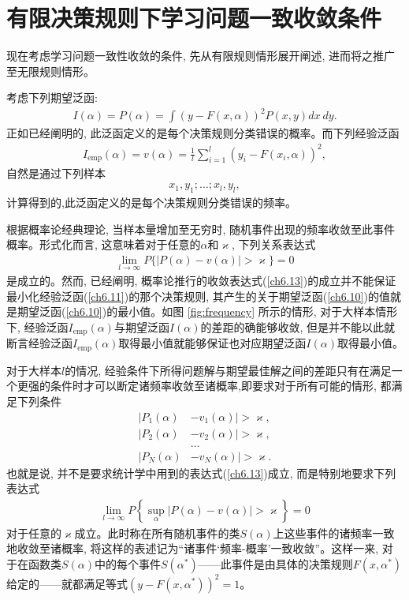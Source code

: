 \section{有限决策规则下学习问题一致收敛条件}
\label{sec:uniform-convergence}
现在考虑学习问题一致性收敛的条件, 先从有限规则情形展开阐述, 进而将之推广至无限规则情形。

考虑下列期望泛函:
\begin{align}\label{ch6.10}
I(\alpha)=P(\alpha)=\int(y-F(x, \alpha))^{2} P(x, y) dx~dy.
\end{align}
正如已经阐明的, 此泛函定义的是每个决策规则分类错误的\textsf{概率}。而下列经验泛函
\begin{align}\label{ch6.11}
I_{\mathrm{emp}}(\alpha)=v(\alpha)=\frac{1}{l} \sum_{i=1}^{l}\left(y_{i}-F\left(x_{i}, \alpha\right)\right)^{2},
\end{align}
自然是通过下列样本
\begin{align}\label{ch6.12}
x_{1}, y_{1} ; \ldots ; x_{l}, y_{l},
\end{align}
计算得到的,此泛函定义的是每个决策规则分类错误的\textsf{频率}。

根据概率论经典理论, 当样本量增加至无穷时, 随机事件出现的频率收敛至此事件概率。形式化而言, 这意味着对于任意的$\alpha$和$\varkappa$, 下列关系表达式
\begin{align}\label{ch6.13}
\lim _{l \rightarrow \infty} P\{|P(\alpha)-v(\alpha)|>\varkappa\}=0
\end{align}
是成立的。然而, \citet{vapnik1982}已经阐明, 概率论推行的收敛表达式(\ref{ch6.13})的成立并不能保证最小化经验泛函(\ref{ch6.11})的那个决策规则, 其产生的关于期望泛函(\ref{ch6.10})的值就是期望泛函(\ref{ch6.10})的最小值。如图 \ref{fig:frequency} 所示的情形, 对于大样本情形下, 经验泛函$I_{\text{emp}}(\alpha)$与期望泛函$I(\alpha)$的差距的确能够收敛, 但是并不能以此就断言经验泛函$I_{\text{emp}}(\alpha)$取得最小值就能够保证也对应期望泛函$I(\alpha)$取得最小值。

对于大样本$l$的情况, 经验条件下所得问题解与期望最佳解之间的差距只有在满足一个更强的条件时才可以\textsf{断定}诸频率收敛至诸概率,即要求对于所有可能的情形, 都满足下列条件
\begin{align*}
|P_{1}(\alpha)&-v_{1}(\alpha)|>\varkappa,\\
|P_{2}(\alpha)&-v_{2}(\alpha)|>\varkappa,\\
&\ldots\\
|P_{N}(\alpha)&-v_{N}(\alpha)|>\varkappa.
\end{align*}
也就是说, 并不是要求统计学中用到的表达式(\ref{ch6.13})成立, 而是特别地要求下列表达式
\begin{align}\label{ch6.14}
\lim_{l \rightarrow \infty} P\left\{\sup _{\alpha}|P(\alpha)-v(\alpha)|>\varkappa\right\}=0
\end{align}
对于任意的$\varkappa$成立。此时称在所有随机事件的类$S(\alpha)$上这些事件的诸频率一致地收敛至诸概率, 将这样的表述记为“诸事件‘频率-概率’一致收敛”。这样一来, 对于在函数类$S(\alpha)$中的每个事件$S(\alpha^{*})$——此事件是由具体的决策规则$F(x,\alpha^{*})$给定的——就都满足等式$(y - F(x, \alpha^{*}))^{2} = 1$。

